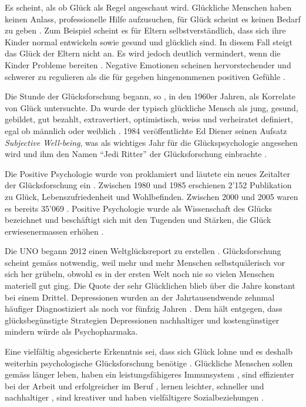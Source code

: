 Es scheint, als ob Glück als Regel angeschaut wird. Glückliche Menschen haben keinen Anlass, professionelle Hilfe aufzusuchen, für Glück scheint es keinen Bedarf zu geben \cite[S.~14]{Veenhoven1991}. Zum Beispiel scheint es für Eltern selbstverständlich, dass sich ihre Kinder normal entwickeln sowie gesund und glücklich sind. In diesem Fall steigt das Glück der Eltern nicht an. Es wird jedoch deutlich vermindert, wenn die Kinder Probleme bereiten \cite{Fingerman2012}. Negative Emotionen scheinen hervorstechender und schwerer zu regulieren als die für gegeben hingenommenen positiven Gefühle \cite{Charles2010}. 

Die Stunde der Glücksforschung begann, so , in den 1960er Jahren, als  Korrelate von Glück untersuchte. Da wurde der typisch glückliche Mensch als jung, gesund, gebildet, gut bezahlt, extravertiert, optimistisch, weiss und verheiratet definiert, egal ob männlich oder weiblich \cite{Bucher2009}. 1984 veröffentlichte Ed Diener \cite{Diener1984} seinen Aufsatz \textit{Subjective Well-being}, was als wichtiges Jahr für die Glückspsychologie angesehen wird und ihm den Namen \enquote{Jedi Ritter} der Glücksforschung einbrachte \cite{Metzger2010}.

Die Positive Psychologie wurde von  proklamiert und läutete ein neues Zeitalter der Glücksforschung ein \cite{Bucher2009}. Zwischen 1980 und 1985 erschienen 2'152 Publikation zu Glück, Lebenszufriedenheit und Wohlbefinden. Zwischen 2000 und 2005 waren es bereits 35'069 \cite{Donaldson2014}. Positive Psychologie wurde als Wissenschaft des Glücks bezeichnet \cite{Carr2011} und beschäftigt sich mit den Tugenden und Stärken, die Glück erwiesenermassen erhöhen \cite{Peterson2004}.

Die UNO begann 2012 einen Weltglücksreport zu erstellen \cite{Helliwell2013}. Glücksforschung scheint gemäss  notwendig, weil mehr und mehr Menschen selbstquälerisch vor sich her grübeln, obwohl es in der ersten Welt noch nie so vielen Menschen materiell gut ging. Die Quote der sehr Glücklichen blieb über die Jahre konstant bei einem Drittel. Depressionen wurden an der Jahrtausendwende zehnmal häufiger Diagnostiziert als noch vor fünfzig Jahren \cite{Seligman2009}. Dem hält  entgegen, dass glücksbegünstigte Strategien Depressionen nachhaltiger und kostengünstiger mindern würde als Psychopharmaka.

Eine vielfältig abgesicherte Erkenntnis sei, dass sich Glück lohne und es deshalb weiterhin psychologische Glücksforschung benötige \cite{Lyubomirsky2005}. Glückliche Menschen sollen gemäss  länger leben, haben ein leistungsfähigeres Immunsystem \cite{Barak2006}, sind effizienter bei der Arbeit und erfolgreicher im Beruf \cite{Achor2010}, lernen leichter, schneller und nachhaltiger \cite{Endres2014}, sind kreativer \cite{Baas2008} und haben vielfältigere Sozialbeziehungen \cite{Rodriguez2014}.


